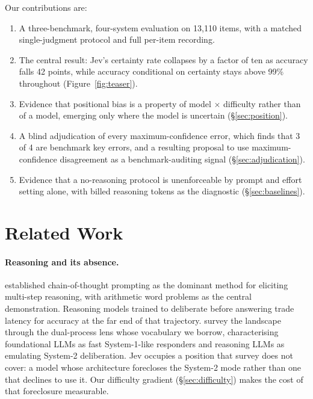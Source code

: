\documentclass[11pt]{article}
\begin{document}
Our contributions are:

\begin{enumerate}
\itemsep0em
\item A three-benchmark, four-system evaluation on 13,110 items, with a matched single-judgment protocol and full per-item recording.
\item The central result: Jev's certainty rate collapses by a factor of ten as accuracy falls 42 points, while accuracy conditional on certainty stays above 99\% throughout (Figure~\ref{fig:teaser}).
\item Evidence that positional bias is a property of model $\times$ difficulty rather than of a model, emerging only where the model is uncertain (\S\ref{sec:position}).
\item A blind adjudication of every maximum-confidence error, which finds that 3 of 4 are benchmark key errors, and a resulting proposal to use maximum-confidence disagreement as a benchmark-auditing signal (\S\ref{sec:adjudication}).
\item Evidence that a no-reasoning protocol is unenforceable by prompt and effort setting alone, with billed reasoning tokens as the diagnostic (\S\ref{sec:baselines}).
\end{enumerate}

\section{Related Work}

\paragraph{Reasoning and its absence.}
\citet{wei2022chain} established chain-of-thought prompting as the dominant method for eliciting multi-step reasoning, with arithmetic word problems as the central demonstration. Reasoning models trained to deliberate before answering \citep{openai2024o1} trade latency for accuracy at the far end of that trajectory. \citet{li2025system1to2} survey the landscape through the dual-process lens whose vocabulary we borrow, characterising foundational LLMs as fast System-1-like responders and reasoning LLMs as emulating System-2 deliberation. Jev occupies a position that survey does not cover: a model whose architecture forecloses the System-2 mode rather than one that declines to use it. Our difficulty gradient (\S\ref{sec:difficulty}) makes the cost of that foreclosure measurable.
\end{document}
